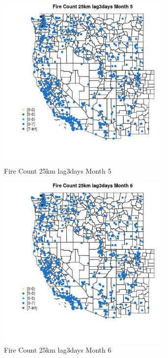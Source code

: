 \begin{figure} 
\centering  
\includegraphics[width=0.77\textwidth]{Code_Outputs/Report_ML_input_PM25_Step4_part_e_de_duplicated_aves_compiled_2019-05-21wNAs_MapObsMo5Fire_Count_25km_lag3days.jpg} 
\caption{\label{fig:Report_ML_input_PM25_Step4_part_e_de_duplicated_aves_compiled_2019-05-21wNAsMapObsMo5Fire_Count_25km_lag3days}Fire Count 25km lag3days Month 5} 
\end{figure} 
 

\begin{figure} 
\centering  
\includegraphics[width=0.77\textwidth]{Code_Outputs/Report_ML_input_PM25_Step4_part_e_de_duplicated_aves_compiled_2019-05-21wNAs_MapObsMo6Fire_Count_25km_lag3days.jpg} 
\caption{\label{fig:Report_ML_input_PM25_Step4_part_e_de_duplicated_aves_compiled_2019-05-21wNAsMapObsMo6Fire_Count_25km_lag3days}Fire Count 25km lag3days Month 6} 
\end{figure} 
 

